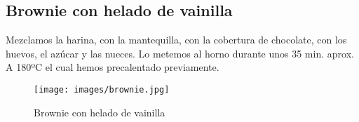 \subsection{Brownie con helado de vainilla}
\label{sec:brownieVa}

Mezclamos la harina, con la mantequilla, con la cobertura de chocolate, con los huevos, el azúcar y las nueces. Lo metemos al horno durante unos 35 min. aprox. A 180ºC el cual hemos precalentado previamente.

\begin{figure}[h]
  \begin{center}
    \texttt{[image: images/brownie.jpg]}
    \caption{Brownie con helado de vainilla}
    \label{fig:brownie}
  \end{center}
\end{figure}

